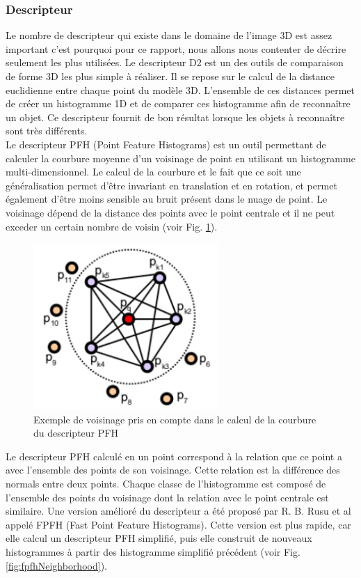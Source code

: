 \subsubsection{Descripteur}
\label{descriptor}
Le nombre de descripteur qui existe dans le domaine de l'image 3D est assez important c'est pourquoi pour ce rapport,
nous allons nous contenter de décrire seulement les plus utilisées. Le descripteur D2\cite{D2} est un des outils de 
comparaison de forme 3D les plus simple à réaliser. Il se repose sur le calcul de la distance euclidienne entre 
chaque point du modèle 3D. L'ensemble de ces distances permet de créer un histogramme 1D et de comparer ces histogramme
afin de reconnaître un objet. Ce descripteur fournit de bon résultat lorsque les objets à reconnaître sont très 
différents.\\

Le descripteur PFH\cite{PFH} (Point Feature Histograms) est un outil permettant de calculer la courbure moyenne d'un voisinage de point en utilisant un histogramme multi-dimensionnel. Le calcul de la courbure et le fait que ce soit une généralisation permet d'être invariant 
en translation et en rotation, et permet également d'être moins sensible au bruit présent dans le nuage de point. Le voisinage 
dépend de la distance des points avec le point centrale et il ne peut exceder un certain nombre de voisin 
(voir Fig. \ref{fig:pfhNeighborhood}).\\

\begin{figure}[!h]
  \begin{center}
    \includegraphics[width=7cm]{image/PFH.png}
    \caption{Exemple de voisinage pris en compte dans le calcul de la courbure du descripteur PFH}
    \label{fig:pfhNeighborhood}
  \end{center}
\end{figure}

Le descripteur PFH calculé en un point correspond à la relation que ce point a avec l'ensemble des points de son voisinage. Cette relation
est la différence des normals entre deux points. Chaque classe de l'histogramme est composé de l'ensemble des points du voisinage dont 
la relation avec le point centrale est similaire. Une version amélioré du descripteur a été proposé par R. B. Rusu et al\cite{FPFH} appelé
FPFH (Fast Point Feature Histograms). Cette version est plus rapide, car elle calcul un descripteur PFH simplifié, puis elle construit
de nouveaux histogrammes à partir des histogramme simplifié précédent (voir Fig. \ref{fig:fpfhNeighborhood}).

